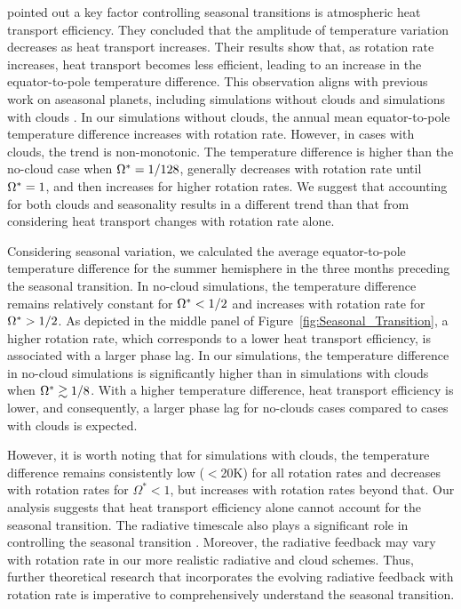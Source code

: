 \citet{guendelman2022-Key} pointed out a key factor controlling seasonal transitions is atmospheric heat transport efficiency. They concluded that the amplitude of temperature variation decreases as heat transport increases. Their results show that, as rotation rate increases, heat transport becomes less efficient, leading to an increase in the equator-to-pole temperature difference. This observation aligns with previous work on aseasonal planets, including simulations without clouds \citep[e.g.,][]{showman2015-THREEDIMENSIONAL,cox2021_radiative} and simulations with clouds \citep[e.g.,][]{komacek2019-Atmospheric,liu2017-effect}. In our simulations without clouds, the annual mean equator-to-pole temperature difference increases with rotation rate. However, in cases with clouds, the trend is non-monotonic. The temperature difference is higher than the no-cloud case when $\Omega^* = 1/128$, generally decreases with rotation rate until $\Omega^* = 1$, and then increases for higher rotation rates. We suggest that accounting for both clouds and seasonality results in a different trend than that from considering heat transport changes with rotation rate alone.

Considering seasonal variation, we calculated the average equator-to-pole temperature difference for the summer hemisphere in the three months preceding the seasonal transition. In no-cloud simulations, the temperature difference remains relatively constant for $\Omega^* < 1/2$ and increases with rotation rate for $\Omega^* > 1/2$. As depicted in the middle panel of Figure~\ref{fig:Seasonal_Transition}, a higher rotation rate, which corresponds to a lower heat transport efficiency, is associated with a larger phase lag. In our simulations, the temperature difference in no-cloud simulations is significantly higher than in simulations with clouds when $\Omega^* \gtrsim 1/8$. With a higher temperature difference, heat transport efficiency is lower, and consequently, a larger phase lag for no-clouds cases compared to cases with clouds is expected.

However, it is worth noting that for simulations with clouds, the temperature difference remains consistently low ($<$20K) for all rotation rates and decreases with rotation rates for $\Omega^* < 1$, but increases with rotation rates beyond that. Our analysis suggests that heat transport efficiency alone cannot account for the seasonal transition. The radiative timescale also plays a significant role in controlling the seasonal transition \citep{guendelman2022-Key,tan2022-Weak,ohno2019_atmospheres}. Moreover, the radiative feedback may vary with rotation rate in our more realistic radiative and cloud schemes. Thus, further theoretical research that incorporates the evolving radiative feedback with rotation rate is imperative to comprehensively understand the seasonal transition.


